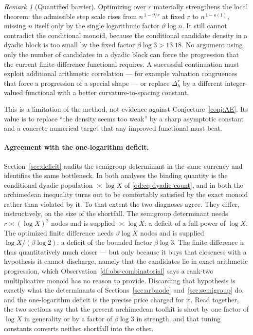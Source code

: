 \documentclass[11pt,oneside]{article}
\theoremstyle{definition}
\theoremstyle{remark}
\newtheorem{remark}[theorem]{Remark}
\newcommand{\thetaq}{\vartheta}
\begin{document}
\begin{remark}[Quantified barrier]
\label{od:rem-barrier}
Optimizing over $r$ materially strengthens the local theorem: the admissible step scale rises
from $n^{\,1-\thetaq/r}$ at fixed $r$ to $n^{\,1-o(1)}$, missing $n$ itself only by the single
logarithmic factor $\thetaq\log n$.  It still cannot contradict the conditional monoid,
because the conditional candidate density in a dyadic block is too small by the fixed factor
$\beta\log3>13.18$.  No argument using only the number of candidates in a dyadic block can
force the progression that the current finite-difference functional requires.  A successful
continuation must exploit additional arithmetic correlation --- for example valuation
congruences that force a progression of a special shape --- or replace $\Delta_h^{r}$ by a
different integer-valued functional with a better curvature-to-spacing constant.
\end{remark}

This is a limitation of the method, not evidence against Conjecture~\ref{conj:AE}.  Its value
is to replace ``the density seems too weak'' by a sharp asymptotic constant and a concrete
numerical target that any improved functional must beat.

\paragraph{Agreement with the one-logarithm deficit.}
Section~\ref{sec:deficit} audits the semigroup determinant in the same currency and identifies
the same bottleneck.  In both analyses the binding quantity is the conditional dyadic
population $\asymp\log X$ of \eqref{od:eq-dyadic-count}, and in both the archimedean
inequality turns out to be comfortably satisfied by the exact monoid rather than violated by
it.  To that extent the two diagnoses agree.  They differ, instructively, on the size of the
shortfall.  The semigroup determinant needs $r\asymp(\log X)^2$ nodes and is supplied
$\asymp\log X$: a deficit of a full power of $\log X$.  The optimized finite difference needs
$\thetaq\log X$ nodes and is supplied $\log X/(\beta\log2)$: a deficit of the bounded factor
$\beta\log3$.  The finite difference is thus quantitatively much closer --- but only because
it buys that closeness with a hypothesis it cannot discharge, namely that the candidates lie
in exact arithmetic progression, which Observation~\ref{df:obs-combinatorial} says a rank-two
multiplicative monoid has no reason to provide.  Discarding that hypothesis is exactly what
the determinants of Sections~\ref{sec:arbnode} and~\ref{sec:semigroup} do, and the
one-logarithm deficit is the precise price charged for it.  Read together, the two sections
say that the present archimedean toolkit is short by one factor of $\log X$ in generality or
by a factor of $\beta\log3$ in strength, and that tuning constants converts neither shortfall
into the other.
\end{document}
